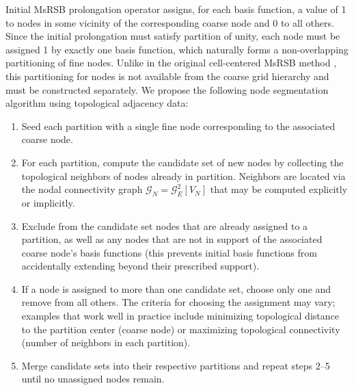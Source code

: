 Initial MsRSB prolongation operator assigns, for each basis function, a value of 1 to nodes in some vicinity of the corresponding coarse node and 0 to all others. Since the initial prolongation must satisfy partition of unity, each node must be assigned 1 by exactly one basis function, which naturally forms a non-overlapping partitioning of fine nodes. Unlike in the original cell-centered MsRSB method \cite{Moyner2016}, this partitioning for nodes is not available from the coarse grid hierarchy and must be constructed separately.   We propose the following node segmentation algorithm using topological adjacency data:
\begin{enumerate}
    \item Seed each partition with a single fine node corresponding to the associated coarse node.
    \item For each partition, compute the candidate set of new nodes by collecting the topological neighbors of nodes already in partition.   Neighbors are located via the nodal connectivity graph $\mathcal{G}_N = \mathcal{G}_E^2[V_N]$ that may be computed explicitly or implicitly.
    \item Exclude from the candidate set nodes that are already assigned to a partition, as well as any nodes that are not in support of the associated coarse node's basis functions (this prevents initial basis functions from accidentally extending beyond their prescribed support).
    \item If a node is assigned to more than one candidate set, choose only one and remove from all others.   The criteria for choosing the assignment may vary; examples that work well in practice include minimizing topological distance to the partition center (coarse node) or maximizing topological connectivity (number of neighbors in each partition).
    \item Merge candidate sets into their respective partitions and repeat steps 2--5 until no unassigned nodes remain.
\end{enumerate}

